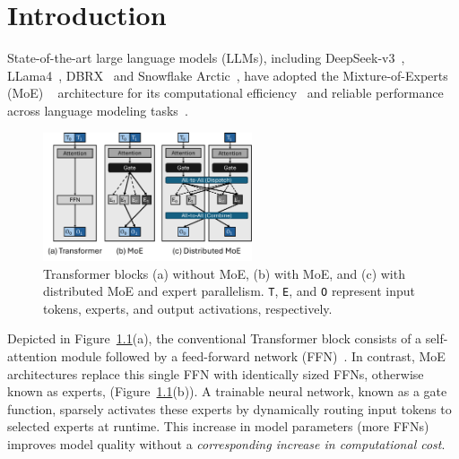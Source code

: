 \chapter{Introduction}\label{ch:introduction}
State-of-the-art large language models (LLMs), including DeepSeek-v3~\cite{deepep}, LLama4~\cite{llama4},
DBRX~\cite{dbrx} and Snowflake Arctic~\cite{arctic}, have adopted the Mixture-of-Experts (MoE)
~\cite{DBLP:conf/iclr/ShazeerMMDLHD17}
architecture for its computational efficiency~\cite{pmlr-v162-rajbhandari22a} and reliable
performance across language modeling tasks~\cite{deepep, llama4, jiang2024mixtralexperts}.
\begin{figure}[!ht]
    \centering
    \includegraphics[width=0.55\textwidth, keepaspectratio]{figures/fig-bg-moe}
    \caption{Transformer blocks (a) without MoE, (b) with MoE, and (c) with distributed MoE and expert parallelism.
        \texttt{T}, \texttt{E}, and \texttt{O} represent input tokens, experts, and output activations, respectively.}
    \label{fig:bg:moe}
\end{figure}

Depicted in Figure~\ref{fig:bg:moe}(a), the conventional Transformer block consists of
a self-attention module followed by a feed-forward network (FFN)~\cite{NIPS2017_3f5ee243}.
In contrast, MoE architectures replace this single FFN with identically sized FFNs,
otherwise known as experts, (Figure~\ref{fig:bg:moe}(b)).
A trainable neural network, known as a gate function, sparsely activates these experts by
dynamically routing input tokens to selected experts at runtime.
This increase in model parameters (more FFNs) improves model quality without a
\textit{corresponding increase in computational cost}.
